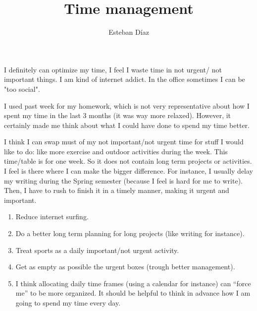 \documentclass[10pt]{article}
\author{Esteban D\'{i}az}
\title{Time management}{}
\begin{document}
\maketitle
I definitely can optimize my time, I feel I waste time in not urgent/ not important things. I 
am kind of internet addict. In the office sometimes I can be "too social".

 I used past week for my homework, which is not very representative about how I spent my time
in the last 3 months (it was way more relaxed). However, it certainly made me think about
what I could have done to spend my time better. 


I think I can swap must of my not important/not urgent time for stuff I would like to do: like
more exercise and outdoor activities during the week. This time/table is for one week. So it 
does not contain long term projects or activities. I feel is there where I can make the bigger
difference. For instance, I usually delay my writing during the Spring semester (because
I feel is hard for me to write). Then, I have to rush to finish it in a timely manner, making
it urgent and important.



\begin{enumerate}
  \item Reduce internet surfing.
  \item Do a better long term planning for long projects (like writing for instance).
  \item Treat sports as a daily important/not urgent activity. 
  \item Get as empty as possible the urgent boxes (trough better management).
  \item I think allocating daily time frames (using a calendar for instance) can 
        ``force me'' to be more organized. It should be helpful to think in advance
        how I am going to spend my time every day. 
\end{enumerate}
\end{document}
